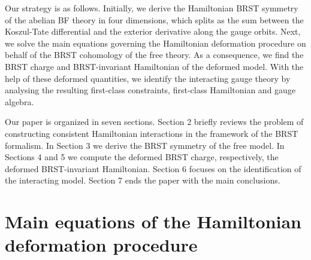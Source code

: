 \documentclass[a4paper,12pt]{article}
\begin{document}
Our strategy is as follows. Initially, we derive the Hamiltonian BRST
symmetry of the abelian BF theory in four dimensions, which splits as the
sum between the Koszul-Tate differential and the exterior derivative along
the gauge orbits. Next, we solve the main equations governing the
Hamiltonian deformation procedure on behalf of the BRST cohomology of the
free theory. As a consequence, we find the BRST charge and BRST-invariant
Hamiltonian of the deformed model. With the help of these deformed
quantities, we identify the interacting gauge theory by analysing the
resulting first-class constraints, first-class Hamiltonian and gauge algebra.

Our paper is organized in seven sections. Section 2 briefly reviews the
problem of constructing consistent Hamiltonian interactions in the framework
of the BRST formalism. In Section 3 we derive the BRST symmetry of the free
model. In Sections 4 and 5 we compute the deformed BRST charge,
respectively, the deformed BRST-invariant Hamiltonian. Section 6 focuses on
the identification of the interacting model. Section 7 ends the paper with
the main conclusions.

\section{Main equations of the Hamiltonian deformation procedure}
\end{document}

